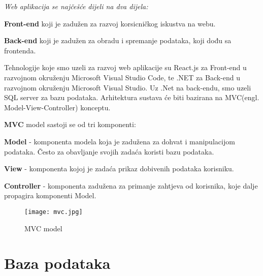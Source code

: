                   \textit{Web aplikacija se najčešće dijeli na dva dijela: }

                               \begin{packed_item}
              			 \item  \textbf{Front-end} koji je zadužen za razvoj korsicničkog iskustva na webu.
                		\item    \textbf{Back-end} koji je zadužen za obradu i spremanje podataka, koji dođu sa frontenda.

              		       \end{packed_item}

                                Tehnologije koje smo uzeli za razvoj web aplikacije su React.js za Front-end u razvojnom okruženju Microsoft Visual Studio Code, te .NET za Back-end u razvojnom okruženju Microsoft Visual Studio.
                                Uz .Net na back-endu, smo uzeli SQL server za bazu podataka. 
                                Arhitektura sustava će biti bazirana na MVC(engl. Model-View-Controller) konceptu.

                      \textbf{MVC} model sastoji se od tri komponenti: 
                                  
                               \begin{packed_item}
             			  \item \textbf{Model} -  komponenta modela koja je zadužena za dohvat i manipulacijom podataka. Često za obavljanje svojih zadaća koristi bazu podataka.
                		  \item  \textbf{View} -   komponenta kojoj je zadaća prikaz dobivenih podataka korisniku.
               		           \item  \textbf{Controller} - komponenta zadužena za primanje zahtjeva od korisnika, koje dalje propagira komponenti Model.

                                \end{packed_item}
                  
                    \begin{figure}[H]
                     \texttt{[image: mvc.jpg]}
                      \centering
                      \caption{MVC model}
                    \end{figure}
                    
                                 

			
		\section{Baza podataka}
			
